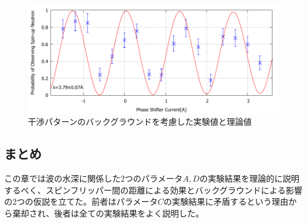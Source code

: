 \begin{figure}[H]
\begin{minipage}{0.5\hsize}
\end{minipage}
\begin{minipage}{0.5\hsize}
\includegraphics[width=\hsize]{discussion/BG/IT_eb_530.pdf}
\end{minipage}
\caption{干渉パターンのバックグラウンドを考慮した実験値と理論値}\label{Disucussion_BG_fig_IT_eb}
\end{figure}

\subsection{まとめ}
この章では波の水深に関係した2つのパラメータ$A,D$の実験結果を理論的に説明するべく、スピンフリッパー間の距離による効果とバックグラウンドによる影響の2つの仮説を立てた。前者はパラメータ$C$の実験結果に矛盾するという理由から棄却され、後者は全ての実験結果をよく説明した。

